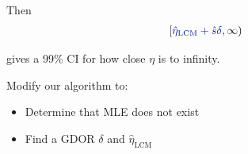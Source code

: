 \documentclass[ 10pt]{beamer}
\newcommand{\etaLCM}{\hat{\eta}_{\textrm{LCM}}}
\begin{document}
{Then %
\begin{align*}
\left [\textcolor{darkblue}{ \etaLCM + \hat{s} \delta}, \infty \right )
\end{align*}

gives a 99\% CI for how close $\eta$ is to infinity.
\vspace{4mm}

\pause
\begin{block}{Modify our algorithm to:}
\begin{itemize}
\item Determine that MLE does not exist
\item Find a GDOR $\delta$ and $\etaLCM$
\end{itemize}
\end{block}
}

%
%
\end{document}
